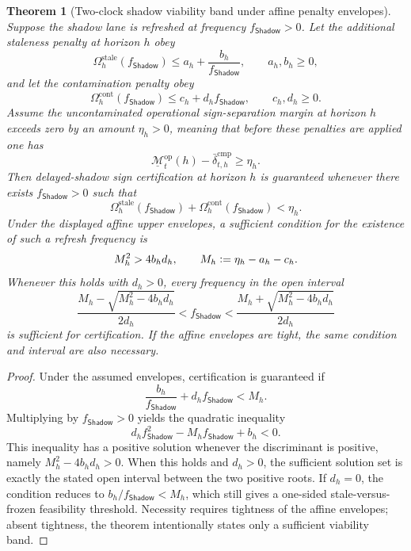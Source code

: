 \documentclass[11pt]{article}
\newtheorem{theorem}{Theorem}[section]
\theoremstyle{definition}
\newcommand{\1}{\mathbf{1}}
\newcommand{\Defeq}{\vcentcolon=}
\newcommand{\Shadow}{\mathsf{Shadow}}
\begin{document}
\begin{theorem}[Two-clock shadow viability band under affine penalty envelopes]\label{thm:two_clock}
Suppose the shadow lane is refreshed at frequency $f_{\Shadow}>0$. Let the additional staleness penalty at horizon $h$ obey
\[
\Omega_h^{\mathrm{stale}}(f_{\Shadow}) \le a_h + \frac{b_h}{f_{\Shadow}},
\qquad a_h,b_h\ge 0,
\]
and let the contamination penalty obey
\[
\Omega_h^{\mathrm{cont}}(f_{\Shadow}) \le c_h + d_h f_{\Shadow},
\qquad c_h,d_h\ge 0.
\]
Assume the uncontaminated operational sign-separation margin at horizon $h$ exceeds zero by an amount $\eta_h>0$, meaning that before these penalties are applied one has
\[
\underline{\mathcal M}_t^{\mathrm{op}}(h)-\bar\delta_{t,h}^{\mathrm{cmp}}\ge \eta_h.
\]
Then delayed-shadow sign certification at horizon $h$ is guaranteed whenever there exists $f_{\Shadow}>0$ such that
\[
\Omega_h^{\mathrm{stale}}(f_{\Shadow}) + \Omega_h^{\mathrm{cont}}(f_{\Shadow}) < \eta_h.
\]
Under the displayed affine upper envelopes, a sufficient condition for the existence of such a refresh frequency is
\[
M_h^2 > 4b_h d_h,
\qquad
M_h\Defeq \eta_h-a_h-c_h.
\]
Whenever this holds with $d_h>0$, every frequency in the open interval
\[
\frac{M_h-\sqrt{M_h^2-4b_h d_h}}{2d_h}
<
 f_{\Shadow}
<
\frac{M_h+\sqrt{M_h^2-4b_h d_h}}{2d_h}
\]
is sufficient for certification. If the affine envelopes are tight, the same condition and interval are also necessary.
\end{theorem}

\begin{proof}
Under the assumed envelopes, certification is guaranteed if
\[
\frac{b_h}{f_{\Shadow}} + d_h f_{\Shadow} < M_h.
\]
Multiplying by $f_{\Shadow}>0$ yields the quadratic inequality
\[
d_h f_{\Shadow}^2 - M_h f_{\Shadow} + b_h < 0.
\]
This inequality has a positive solution whenever the discriminant is positive, namely $M_h^2-4b_h d_h>0$. When this holds and $d_h>0$, the sufficient solution set is exactly the stated open interval between the two positive roots. If $d_h=0$, the condition reduces to $b_h/f_{\Shadow}<M_h$, which still gives a one-sided stale-versus-frozen feasibility threshold. Necessity requires tightness of the affine envelopes; absent tightness, the theorem intentionally states only a sufficient viability band.
\end{proof}
\end{document}
